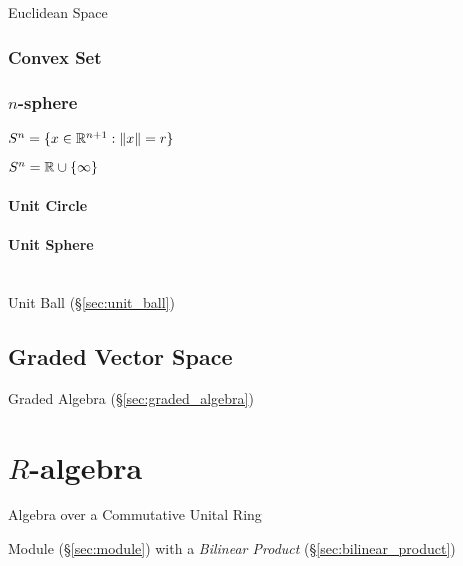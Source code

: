 Euclidean Space %



\subsubsection{Convex Set}\label{sec:convex_set}

\subsubsection{$n$-sphere}\label{sec:n_sphere}

$S^n = \{ x \in \mathbb{R}^{n+1} : \|x\| = r \}$

$S^n = \mathbb{R} \cup \{\infty\}$



\paragraph{Unit Circle}\label{sec:unit_circle}

\paragraph{Unit Sphere}\label{sec:unit_sphere}
\hfill \\

Unit Ball (\S\ref{sec:unit_ball})



\subsection{Graded Vector Space}\label{sec:graded_vectorspace}

Graded Algebra (\S\ref{sec:graded_algebra})



\section{$R$-algebra}\label{sec:r_algebra}

Algebra over a Commutative Unital Ring

Module (\S\ref{sec:module}) with a \emph{Bilinear Product}
(\S\ref{sec:bilinear_product})



